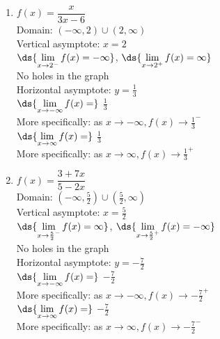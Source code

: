 \documentclass{ximera}
\begin{document}
\begin{multicols}{2}
\begin{enumerate}
\setcounter{enumi}{\value{HW}}

\item $f(x) = \dfrac{x}{3x - 6}$ \\
Domain: $(-\infty, 2) \cup (2, \infty)$\\
Vertical asymptote: $x = 2$\\
$\ds{\lim_{x \rightarrow 2^{-}} f(x) = -\infty}$, $\ds{\lim_{x \rightarrow 2^{+}} f(x) = \infty}$ \\
No holes in the graph\\
Horizontal asymptote: $y = \frac{1}{3}$ \\
$\ds{\lim_{x \rightarrow  -\infty} f(x) =}$ $\frac{1}{3}$\\
More specifically: as $x \rightarrow -\infty, f(x) \rightarrow \frac{1}{3}^{-}$\\
$\ds{\lim_{x \rightarrow  \infty} f(x) =}$ $\frac{1}{3}$\\
More specifically:  as $x \rightarrow \infty, f(x) \rightarrow \frac{1}{3}^{+}$\\

\vfill

\columnbreak

\item $f(x) = \dfrac{3 + 7x}{5 - 2x}$\\
Domain: $(-\infty, \frac{5}{2}) \cup (\frac{5}{2}, \infty)$\\
Vertical asymptote: $x = \frac{5}{2}$\\
$\ds{\lim_{x \rightarrow \frac{5}{2}^{-}} f(x) = \infty}$, $\ds{\lim_{x \rightarrow \frac{5}{2}^{+}} f(x) = -\infty}$ \\
No holes in the graph\\
Horizontal asymptote: $y = -\frac{7}{2}$ \\
$\ds{\lim_{x \rightarrow - \infty} f(x) =}$ $-\frac{7}{2}$\\
More specifically: as $x \rightarrow -\infty, f(x) \rightarrow -\frac{7}{2}^{+}$\\
$\ds{\lim_{x \rightarrow  \infty} f(x) =}$ $-\frac{7}{2}$\\
More specifically: as  $x \rightarrow \infty, f(x) \rightarrow -\frac{7}{2}^{-}$\\

\setcounter{HW}{\value{enumi}}
\end{enumerate}
\end{multicols}
\end{document}
